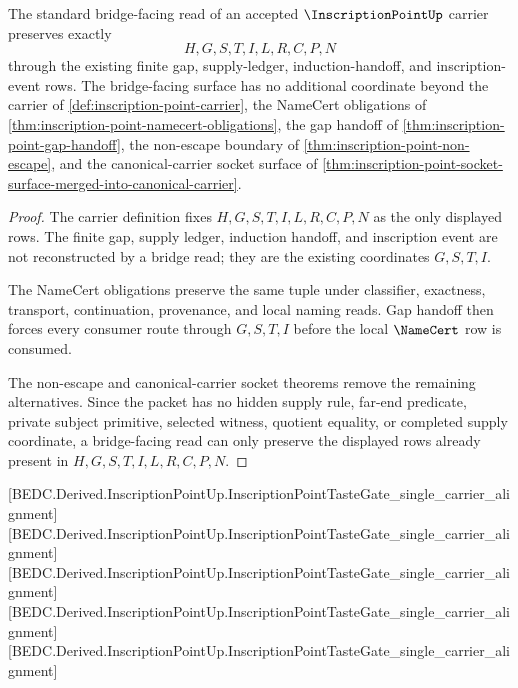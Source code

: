 \begin{theorem}
\label{thm:inscription-point-bridge-facing-preservation}
The standard bridge-facing read of an accepted $\InscriptionPointUp$ carrier preserves exactly
$$
H,G,S,T,I,L,R,C,P,N
$$
through the existing finite gap, supply-ledger, induction-handoff, and inscription-event rows. The bridge-facing surface has no additional coordinate beyond the carrier of \autoref{def:inscription-point-carrier}, the NameCert obligations of \autoref{thm:inscription-point-namecert-obligations}, the gap handoff of \autoref{thm:inscription-point-gap-handoff}, the non-escape boundary of \autoref{thm:inscription-point-non-escape}, and the canonical-carrier socket surface of \autoref{thm:inscription-point-socket-surface-merged-into-canonical-carrier}.
\end{theorem}
\begin{proof}
The carrier definition fixes $H,G,S,T,I,L,R,C,P,N$ as the only displayed rows. The finite gap, supply ledger, induction handoff, and inscription event are not reconstructed by a bridge read; they are the existing coordinates $G,S,T,I$.

The NameCert obligations preserve the same tuple under classifier, exactness, transport, continuation, provenance, and local naming reads. Gap handoff then forces every consumer route through $G,S,T,I$ before the local $\NameCert$ row is consumed.

The non-escape and canonical-carrier socket theorems remove the remaining alternatives. Since the packet has no hidden supply rule, far-end predicate, private subject primitive, selected witness, quotient equality, or completed supply coordinate, a bridge-facing read can only preserve the displayed rows already present in $H,G,S,T,I,L,R,C,P,N$.
\end{proof}

[BEDC.Derived.InscriptionPointUp.InscriptionPointTasteGate\_single\_carrier\_alignment]
[BEDC.Derived.InscriptionPointUp.InscriptionPointTasteGate\_single\_carrier\_alignment]
[BEDC.Derived.InscriptionPointUp.InscriptionPointTasteGate\_single\_carrier\_alignment]
[BEDC.Derived.InscriptionPointUp.InscriptionPointTasteGate\_single\_carrier\_alignment]
[BEDC.Derived.InscriptionPointUp.InscriptionPointTasteGate\_single\_carrier\_alignment]

